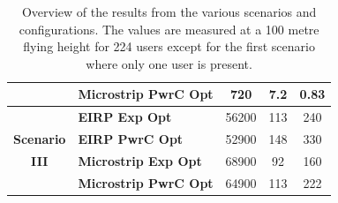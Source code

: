 \begin{table}[h!]
\begin{tabular}{|c|l|c|c|c|}
                                                                  & \textbf{Microstrip \acs{PwrC Opt}}       &    720                                  &      7.2                    &     0.83                \\ \hline
                                                                  & \textbf{EIRP \acs{Exp Opt}}                 &    56200                                &      113                    &     240                 \\ \cline{2-5} 
\textbf{Scenario}                                                 & \textbf{EIRP \acs{PwrC Opt}}             &    52900                                &      148                    &     330                 \\ \cline{2-5} 
\textbf{III}                                                      & \textbf{Microstrip \acs{Exp Opt}}        &    68900                                &      92                     &     160                 \\ \cline{2-5} 
                                                                  & \textbf{Microstrip \acs{PwrC Opt}}       &    64900                                &      113                    &     222                 \\ \hline
\end{tabular}
\caption{Overview of the results from the various scenarios and configurations. The values are measured at a 100 metre flying height for 224 users except for the first scenario where only one user is present.}
\label{table:resultOverview}
\end{table}